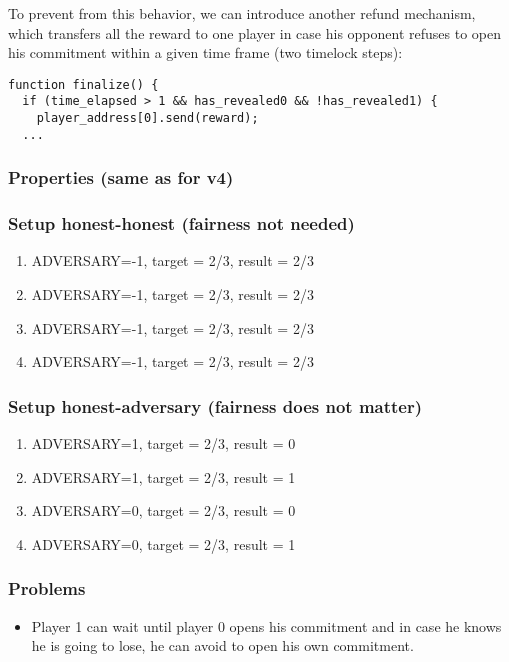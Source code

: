 \documentclass{article}
\begin{document}
To prevent from this behavior, we can introduce another refund mechanism, which transfers all the reward
to one player in case his opponent refuses to open his commitment within a given time frame (two timelock steps):
\begin{lstlisting}
function finalize() {
  if (time_elapsed > 1 && has_revealed0 && !has_revealed1) {
    player_address[0].send(reward);
  ...
\end{lstlisting}

\subsubsection{Properties (same as for v4)}



\subsubsection{Setup honest-honest (fairness not needed)}

\begin{enumerate}
\item ADVERSARY=-1, target = 2/3, result = 2/3
\item ADVERSARY=-1, target = 2/3, result = 2/3
\item ADVERSARY=-1, target = 2/3, result = 2/3
\item ADVERSARY=-1, target = 2/3, result = 2/3
\end{enumerate}

\subsubsection{Setup honest-adversary (fairness does not matter)}

\begin{enumerate}
\item ADVERSARY=1, target = 2/3, result = 0
\item ADVERSARY=1, target = 2/3, result = 1
\item ADVERSARY=0, target = 2/3, result = 0
\item ADVERSARY=0, target = 2/3, result = 1
\end{enumerate}

\subsubsection{Problems}

\begin{itemize}
\item Player 1 can wait until player 0 opens his commitment and in case he knows he is going to lose, he can 
avoid to open his own commitment.
\end{itemize}
\end{document}
